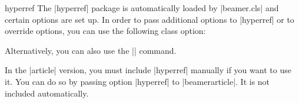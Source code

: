 \begin{package}{{hyperref}}
  \beamernote
  The |hyperref| package is automatically loaded by |beamer.cls| and certain options are set up. In order to pass additional options to |hyperref| or to override options, you can use the following class option:


  Alternatively, you can also use the |\hypersetup| command.

  \articlenote
  In the |article| version, you must include |hyperref| manually if you want to use it. You can do so by passing option |hyperref| to |beamerarticle|. It is not included automatically.
\end{package}

